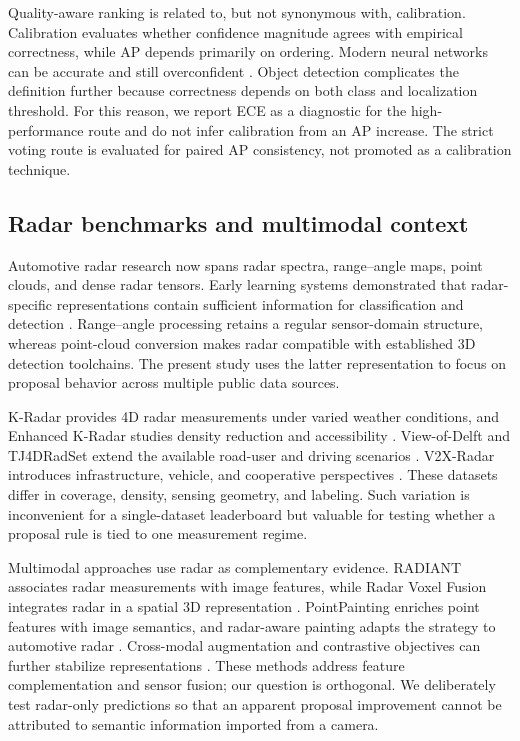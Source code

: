 \documentclass[preprint,12pt,times]{elsarticle}
\begin{document}
Quality-aware ranking is related to, but not synonymous with, calibration.
Calibration evaluates whether confidence magnitude agrees with empirical
correctness, while AP depends primarily on ordering. Modern neural networks
can be accurate and still overconfident \cite{guo2017calibration}. Object
detection complicates the definition further because correctness depends on
both class and localization threshold. For this reason, we report ECE as a
diagnostic for the high-performance route and do not infer calibration from an
AP increase. The strict voting route is evaluated for paired AP consistency,
not promoted as a calibration technique.

\subsection{Radar benchmarks and multimodal context}

Automotive radar research now spans radar spectra, range--angle maps, point
clouds, and dense radar tensors. Early learning systems demonstrated that
radar-specific representations contain sufficient information for
classification and detection \cite{patel2019radarspectra,wang2021rodnet}.
Range--angle processing retains a regular sensor-domain structure, whereas
point-cloud conversion makes radar compatible with established 3D detection
toolchains. The present study uses the latter representation to focus on
proposal behavior across multiple public data sources.

K-Radar provides 4D radar measurements under varied weather conditions, and
Enhanced K-Radar studies density reduction and accessibility
\cite{paek2022kradar,paek2023enhancedkradar}. View-of-Delft and TJ4DRadSet
extend the available road-user and driving scenarios
\cite{palffy2022viewofdelft,zheng2022tj4dradset}. V2X-Radar introduces
infrastructure, vehicle, and cooperative perspectives
\cite{yang2024v2xradar}. These datasets differ in coverage, density, sensing
geometry, and labeling. Such variation is inconvenient for a single-dataset
leaderboard but valuable for testing whether a proposal rule is tied to one
measurement regime.

Multimodal approaches use radar as complementary evidence. RADIANT associates
radar measurements with image features, while Radar Voxel Fusion integrates
radar in a spatial 3D representation
\cite{long2023radiant,nobis2021radarvoxelfusion}. PointPainting enriches point
features with image semantics, and radar-aware painting adapts the strategy to
automotive radar \cite{vora2020pointpainting,montiel2024pointcloudpainting}.
Cross-modal augmentation and contrastive objectives can further stabilize
representations \cite{deng2024crossmodal,zhang2024contrastiveradar}. These
methods address feature complementation and sensor fusion; our question is
orthogonal. We deliberately test radar-only predictions so that an apparent
proposal improvement cannot be attributed to semantic information imported
from a camera.
\end{document}
